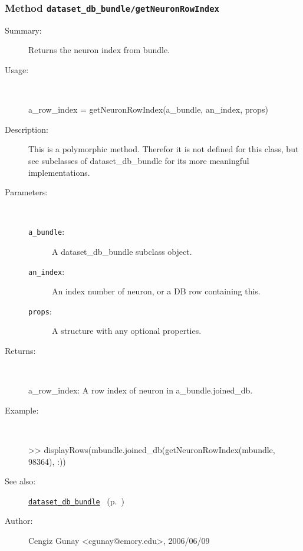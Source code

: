 \subsubsection[Method \texttt{getNeuronRowIndex}]{Method \texttt{dataset\_db\_bundle/getNeuronRowIndex}}%
%
\label{ref_dataset_db_bundle__getNeuronRowIndex}%
\hypertarget{ref_dataset_db_bundle__getNeuronRowIndex}{}%
\begin{description}
\item[Summary:]Returns the neuron index from bundle.
%
\item[Usage:]~%
\begin{lyxcode}%
a\_row\_index = getNeuronRowIndex(a\_bundle, an\_index, props)
%
\end{lyxcode}%
%
\item[Description:]%
This is a polymorphic method. Therefor it is not defined for this class, 
 but see subclasses of dataset\_db\_bundle for its more meaningful implementations.
\item[Parameters:]~
\begin{description}%
\item[\texttt{a\_bundle}:]
 A dataset\_db\_bundle subclass object.
\item[\texttt{an\_index}:]
 An index number of neuron, or a DB row containing this.
\item[\texttt{props}:]
 A structure with any optional properties.
\end{description}%
%
\item[Returns:
]~

	a\_row\_index: A row index of neuron in a\_bundle.joined\_db.
%
\item[Example:]~
\begin{lyxcode} >> displayRows(mbundle.joined\_db(getNeuronRowIndex(mbundle, 98364), :))
\\%
\end{lyxcode}
%
\item[See also:]%
\hyperlink{ref_dataset_db_bundle}{\texttt{dataset\_db\_bundle}}%
\ (p.~\pageref{ref_dataset_db_bundle})%
%
%
\item[Author:]%
Cengiz Gunay <cgunay@emory.edu>, 2006/06/09
%
\end{description}
\methodline%
